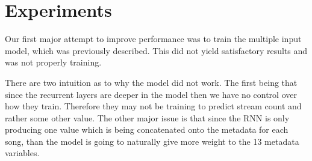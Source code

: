 \documentclass[11pt]{article}
\begin{document}
% 
% 
% 
% 
\section{Experiments}

Our first major attempt to improve performance was to train the multiple input model, which was previously described. This did not yield satisfactory results and was not properly training. %

 There are two intuition as to why the model did not work. The first being that since the recurrent layers are deeper in the model then we have no control over how they train. Therefore they may not be training to predict stream count and rather some other value. The other major issue is that since the RNN is only producing one value which is being concatenated onto the metadata for each song, than the model is going to naturally give more weight to the 13 metadata variables. 

\end{document}
